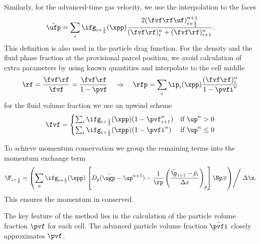 Similarly, for the advanced-time gas velocity, we use the interpolation to the faces
\begin{equation*}
    \tilde{\ufp} = \sum_i \ifg_{i+\frac{1}{2}} (\xpp) \dfrac{2 (\fvf \rf \uf)_{i+\frac{1}{2}}^{n+1}}{(\fvf \rf)_i^n + (\fvf \rf)_{i+1}^n}.
\end{equation*}
This definition is also used in the particle drag function. 
For the density and the fluid phase fraction at the provisional parcel position, we avoid calculation of extra parameters by using known quantities and interpolate to the cell middle
\begin{align*}
    \rf = \dfrac{\fvf \rf}{\fvf} = \dfrac{\fvf \rf}{1-\pvf} \quad
    \Rightarrow \quad \rfp = \sum_i \ip_i (\xpp) \dfrac{(\fvf \rf)_i^n}{1 - \pvfi^n}
\end{align*}
for the fluid volume fraction we use an upwind scheme
\begin{align*}
    \fvf = \begin{cases}
        \sum_i \ifg_{i+\frac{1}{2}} (\xpp) (1 - \pvf_{i+1}^n) & \text{if } \up^n > 0 \\
        \sum_i \ifg_{i+\frac{1}{2}} (\xpp) (1 - \pvfi^n) & \text{if } \up^n \leq 0
    \end{cases}
\end{align*}

To achieve momentum conservation we group the remaining terms into the momentum exchange term
\begin{equation*}
    \F_{i+\frac{1}{2}} = \left( \sum_p \ifg_{i+\frac{1}{2}} (\xpp) \left. \left[ D_p (\tilde{\ugp} - \up^{n+1} ) - \dfrac{1}{\rp} \left( \dfrac{\tilde{\p}_{i+1} - \tilde{p}_i}{\Delta x}\right)_p \right] \Np \mp \right) \middle / \right. \Delta \x.
\end{equation*}
This ensures the momentum in conserved.

The key feature of the \MP method lies in the calculation of the particle volume fraction $\pvf$ for each cell. 
The advanced particle volume fraction $\tilde{\pvfi}$ closely approximates $\pvf$.

